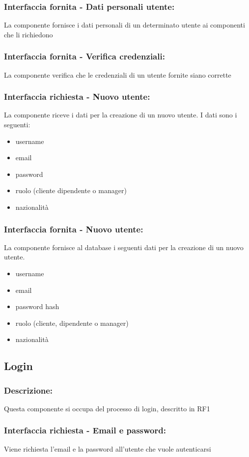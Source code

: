 \documentclass{report}
\begin{document}
\subsubsection{Interfaccia fornita - Dati personali utente: }La componente fornisce i dati personali di un determinato utente ai componenti che li richiedono
\subsubsection{Interfaccia fornita - Verifica credenziali: }La componente verifica che le credenziali di un utente fornite siano corrette 

\subsubsection{Interfaccia richiesta - Nuovo utente: }La componente riceve i dati per la creazione di un nuovo utente. I dati sono i seguenti:
\begin{itemize}
	\item username
	\item email
	\item password
	\item ruolo (cliente dipendente o manager)
	\item nazionalità
\end{itemize}
\subsubsection{Interfaccia fornita - Nuovo utente: }La componente fornisce al database i seguenti dati per la creazione di un nuovo utente.
\begin{itemize}
	\item username
	\item email
	\item password hash
	\item ruolo (cliente, dipendente o manager)
	\item nazionalità
\end{itemize}
\subsection*{Login}
\subsubsection{Descrizione: }Questa componente si occupa del processo di login, descritto in RF1
\subsubsection{Interfaccia richiesta - Email e password: } Viene richiesta l'email e la password all'utente che vuole autenticarsi
\end{document}
